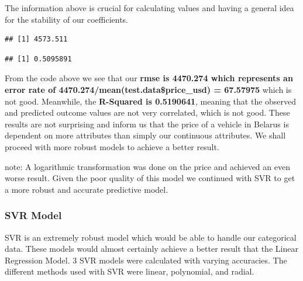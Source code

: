 \documentclass[
]{article}
\newenvironment{Shaded}{\begin{snugshade}}{\end{snugshade}}
\newcommand{\CommentTok}[1]{\textcolor[rgb]{0.56,0.35,0.01}{\textit{#1}}}
\newcommand{\FunctionTok}[1]{\textcolor[rgb]{0.00,0.00,0.00}{#1}}
\newcommand{\NormalTok}[1]{#1}
\newcommand{\OtherTok}[1]{\textcolor[rgb]{0.56,0.35,0.01}{#1}}
\newcommand{\SpecialCharTok}[1]{\textcolor[rgb]{0.00,0.00,0.00}{#1}}
\begin{document}
The information above is crucial for calculating values and having a
general idea for the stability of our coefficients.

\begin{Shaded}
\end{Shaded}

\begin{verbatim}
## [1] 4573.511
\end{verbatim}

\begin{Shaded}
\end{Shaded}

\begin{verbatim}
## [1] 0.5095891
\end{verbatim}

From the code above we see that our \textbf{rmse is 4470.274 which
represents an error rate of 4470.274/mean(test.data\$price\_usd) =
67.57975} which is not good. Meanwhile, the \textbf{R-Squared is
0.5190641}, meaning that the observed and predicted outcome values are
not very correlated, which is not good. These results are not surprising
and inform us that the price of a vehicle in Belarus is dependent on
more attributes than simply our continuous attributes. We shall proceed
with more robust models to achieve a better result.

note: A logarithmic transformation was done on the price and achieved an
even worse result. Given the poor quality of this model we continued
with SVR to get a more robust and accurate predictive model.

\hypertarget{svr-model}{%
\subsubsection{SVR Model}\label{svr-model}}

SVR is an extremely robust model which would be able to handle our
categorical data. These models would almost certainly achieve a better
result that the Linear Regression Model. 3 SVR models were calculated
with varying accuracies. The different methods used with SVR were
linear, polynomial, and radial.
\end{document}
